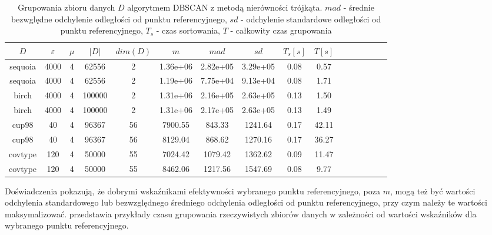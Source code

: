 \begin{table}[h] 
	\footnotesize
	\tabcolsep=0.11cm
	\centering
	\begin{tabular}{|c|c|c|c|c|c|c|c|c|c|c|c|c|c|c|c|}
		\hline 
		$D$			&$ \varepsilon $ & $ \mu $ & $|D|$&$dim(D)$&$m$&$mad$&$sd$&$T_s [s]$&$T[s]$\\\hline
		sequoia&4000&4&62556&2&1.36e+06&2.82e+05&3.29e+05&0.08&0.57\\\hline
		sequoia&4000&4&62556&2&1.19e+06&7.75e+04&9.13e+04&0.08&1.71\\\hline
		birch&4000&4&100000&2&1.31e+06&2.16e+05&2.63e+05&0.13&1.50\\\hline
		birch&4000&4&100000&2&1.31e+06&2.17e+05&2.63e+05&0.13&1.49\\\hline
		cup98&40&4&96367&56&7900.55&843.33&1241.64&0.17&42.11\\\hline
		cup98&40&4&96367&56&8129.04&868.62&1270.16&0.17&36.27\\\hline
		covtype&120&4&50000&55&7024.42&1079.42&1362.62&0.09&11.47\\\hline
		covtype&120&4&50000&55&8462.06&1217.56&1547.69&0.08&9.77\\\hline
	\end{tabular}
	\caption{Grupowania zbioru danych $ D $ algorytmem DBSCAN z metodą nierówności trójkąta. $ mad $ - średnie bezwględne odchylenie odległości od punktu referencyjnego, $ sd $ - odchylenie standardowe odległości od punktu referencyjnego, $ T_s $ - czas sortowania, $ T $ - całkowity czas grupowania}\label{tbl:ti-time-by-ref}
\end{table}
Doświadczenia pokazują, że dobrymi wskaźnikami efektywności wybranego punktu referencyjnego, poza $ m $, mogą też być wartości odchylenia standardowego lub bezwzględnego średniego odchylenia odległości od punktu referencyjnego, przy czym należy te wartości maksymalizować.  przedstawia przykłady czasu grupowania rzeczywistych zbiorów danych w zależności od wartości wskaźników dla wybranego punktu referencyjnego.


